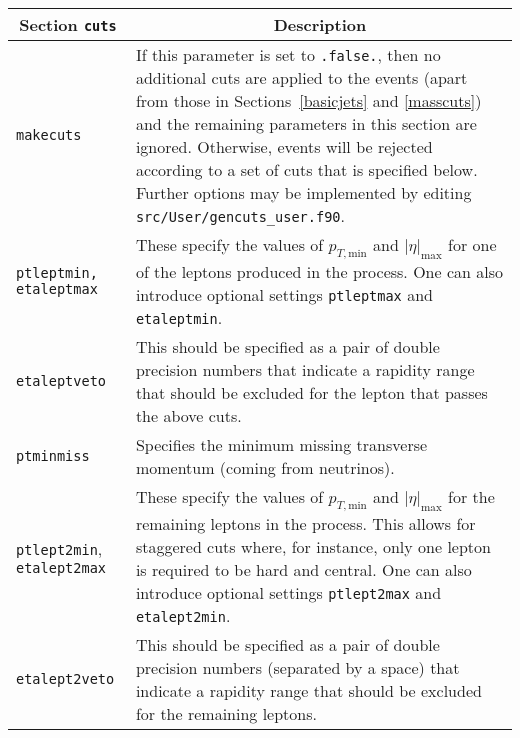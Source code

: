 	\begin{longtable}{p{1.5cm}p{12cm}}
		\hline
		\multicolumn{1}{c}{{\textbf{Section} \texttt{cuts}}} & \multicolumn{1}{c}{{\textbf{Description}}} \\ 
		\hline
		\texttt{makecuts} &
		If this parameter is set to {\tt .false.}, then
		no additional cuts are applied to the events (apart from those in Sections~\ref{basicjets} and \ref{masscuts})
                and the remaining parameters in this section are ignored. Otherwise, events will
		be rejected according to a set of cuts that is specified below.
		Further options may be implemented by editing {\tt src/User/gencuts\_user.f90}. \\
		
		{\tt ptleptmin, etaleptmax} & These specify the values
		of $p_{T,{\mathrm{min}}}$ and $|\eta|_{\mathrm{max}}$ for one of the leptons produced
		in the process. One can also introduce optional settings \texttt{ptleptmax}
		and \texttt{etaleptmin}. \\
		
		{\tt etaleptveto} & This should be specified as a pair of double
		precision numbers that indicate a rapidity range that should be excluded
		for the lepton that passes the above cuts. \\
		
		{\tt ptminmiss} & Specifies the minimum missing transverse
		momentum (coming from neutrinos). \\
		
		{\tt ptlept2min}, \texttt{etalept2max} & These specify
		the values of $p_{T,{\mathrm{min}}}$ and $|\eta|_{\mathrm{max}}$ for the remaining
		leptons in the process. This allows for staggered cuts where, for
		instance, only one lepton is required to be hard and central.
		One can also introduce optional settings \texttt{ptlept2max} and
		\texttt{etalept2min}. \\
		
		{\tt etalept2veto} & This should be specified as a pair of double
		precision numbers (separated by a space) that indicate a rapidity range that should be excluded
		for the remaining leptons. \\
		
		\hline
	\end{longtable}
\clearpage
